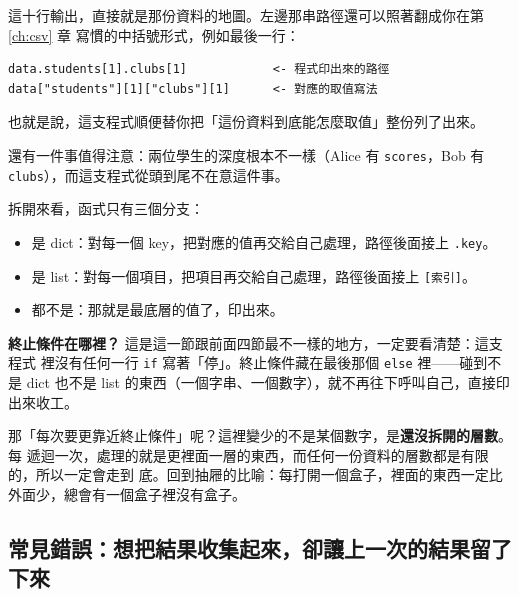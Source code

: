 
這十行輸出，直接就是那份資料的地圖。左邊那串路徑還可以照著翻成你在第 \ref{ch:csv} 章
寫慣的中括號形式，例如最後一行：
\begin{verbatim}
data.students[1].clubs[1]            <- 程式印出來的路徑
data["students"][1]["clubs"][1]      <- 對應的取值寫法
\end{verbatim}
也就是說，這支程式順便替你把「這份資料到底能怎麼取值」整份列了出來。

還有一件事值得注意：兩位學生的深度根本不一樣（Alice 有 \texttt{scores}，Bob 有
\texttt{clubs}），而這支程式從頭到尾不在意這件事。

拆開來看，函式只有三個分支：

\begin{itemize}
\item 是 dict：對每一個 key，把對應的值再交給自己處理，路徑後面接上 \texttt{.key}。
\item 是 list：對每一個項目，把項目再交給自己處理，路徑後面接上 \texttt{[索引]}。
\item 都不是：那就是最底層的值了，印出來。
\end{itemize}

\textbf{終止條件在哪裡？} 這是這一節跟前面四節最不一樣的地方，一定要看清楚：這支程式
裡沒有任何一行 \texttt{if} 寫著「停」。終止條件藏在最後那個 \texttt{else} 裡——碰到不是
dict 也不是 list 的東西（一個字串、一個數字），就不再往下呼叫自己，直接印出來收工。

那「每次要更靠近終止條件」呢？這裡變少的不是某個數字，是\textbf{還沒拆開的層數}。每
遞迴一次，處理的就是更裡面一層的東西，而任何一份資料的層數都是有限的，所以一定會走到
底。回到抽屜的比喻：每打開一個盒子，裡面的東西一定比外面少，總會有一個盒子裡沒有盒子。

\subsection*{常見錯誤：想把結果收集起來，卻讓上一次的結果留了下來}

